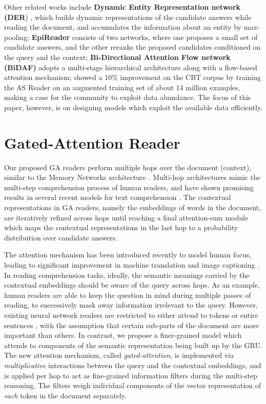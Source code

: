 \documentclass[11pt,a4paper]{article}
\begin{document}
Other related works include \textbf{Dynamic Entity Representation network (DER}) \citep{kobayashi2016dynamic},
which builds dynamic representations of the candidate answers while reading the document, and accumulates the information about an entity by max-pooling;
\textbf{EpiReader} \citep{trischler2016natural}
consists of two networks, where one proposes a small set of candidate answers, and the other reranks the proposed candidates conditioned on the query and the context; \textbf{Bi-Directional Attention Flow network (BiDAF)} \cite{seo2016bidirectional} adopts a multi-stage hierarchical architecture along with a flow-based attention mechanism;
\citet{bajgar2016embracing} showed a 10\% improvement on the CBT corpus \citep{hill2015goldilocks} by training the AS Reader on an augmented training set of about 14 million examples, making a case for the community to exploit data abundance. The focus of this paper, however, is on designing models which exploit the available data efficiently.

\section{Gated-Attention Reader}
\label{sec:ga}




Our proposed GA readers perform multiple hops over the document (context), similar to the Memory Networks architecture \citep{sukhbaatar2015end}.
Multi-hop architectures mimic the multi-step comprehension process of human readers,
and have shown promising results in several recent models for text comprehension \citep{sordoni2016iterative, kumar2015ask, shen2016reasonet}.
The contextual representations in GA readers,
namely the embeddings of words in the document,
are iteratively refined across hops
until reaching a final attention-sum module \citep{kadlec2016text} which maps 
the contextual representations in the last hop to a probability distribution over candidate answers.

The attention mechanism has been introduced recently to model human focus,
leading to significant improvement in machine translation and image captioning \citep{bahdanau2014neural, mnih2014recurrent}.
In reading comprehension tasks, ideally,
the semantic meanings carried by the contextual embeddings should be aware of the query across hops.
As an example,
human readers are able to keep the question in mind during multiple passes of reading,
to successively mask away information irrelevant to the query.
However,
existing neural network readers are restricted to either attend to tokens \citep{hermann2015teaching, chen2016thorough}
or entire sentences \citep{weston2014memory}, with the assumption that certain sub-parts of the document are more important than others.
In contrast, 
we propose a finer-grained model which attends to components of the semantic representation being built up by the GRU.
The new attention mechanism,
called \emph{gated-attention},
is implemented via \emph{multiplicative} interactions between the query and the contextual embeddings,
and is applied per hop to act as fine-grained information filters during the multi-step reasoning. The filters weigh individual components of the vector representation of \textit{each} token in the document separately.
\end{document}

